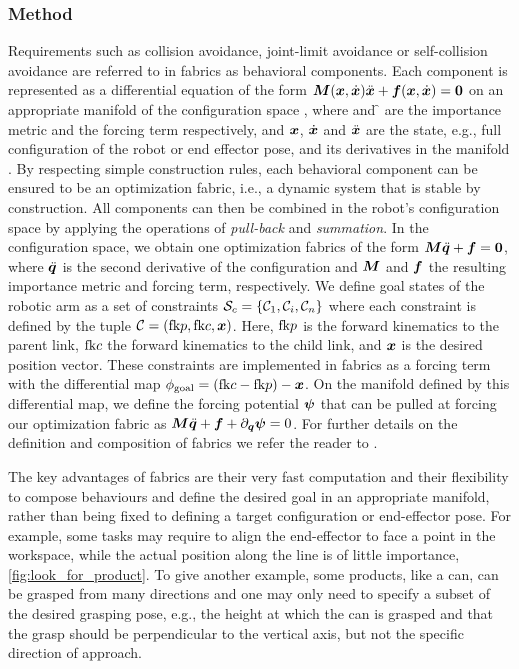 \subsubsection{Method}
Requirements such as collision avoidance, joint-limit avoidance or self-collision avoidance are referred to in fabrics as behavioral components. Each component is represented as a differential equation of the form
$\bm{M}(\bm{x},\dot{\bm{x}})\ddot{\bm{x}}+\bm{f}(\bm{x},\dot{\bm{x}})=\bm{0}$ on an appropriate
manifold \X{} of the configuration space \Q{}, where \M{} and \f{} are the importance metric and the forcing term respectively, and $\bm{x}$, $\dot{\bm{x}}$ and $\ddot{\bm{x}}$ are the state, e.g., full configuration of the robot or end effector pose, and its derivatives in the manifold \X{}.
By respecting
simple construction rules, each behavioral component can be ensured to
be an optimization fabric, i.e., a dynamic system that is
stable by construction. All components can then be combined
in the robot's configuration space by applying the
operations of \textit{pull-back} and \textit{summation}. In
the configuration space, we obtain one optimization fabrics
of the form $\bm{M}\ddot{\bm{q}} + \bm{f} = \bm{0}$, where $\ddot{\bm{q}}$ is the second derivative of the configuration and $\bm{M}$ and $\bm{f}$ the resulting importance metric and forcing term, respectively.
We define goal states of the robotic arm as a set of
constraints $\mathcal{S}_c = \{\mathcal{C}_1,\mathcal{C}_i,\mathcal{C}_n\}$ where each
constraint \Con{} is defined by the tuple
$\mathcal{C}=(\textrm{fk}{p},\textrm{fk}{c},\bm{x})$. Here, $\textrm{fk}{p}$ is the forward
kinematics to the parent link, $\textrm{fk}{c}$ the forward
kinematics to the child link, and $\bm{x}$ is the desired position
vector. These constraints are implemented in \ac{fabrics} as a forcing term with the
differential map $\phi_{\textrm{goal}} = (\textrm{fk}{c} - \textrm{fk}{p}) -
\bm{x}$. On the manifold defined by this differential map, we
define the forcing potential $\bm{\psi}$ that can be pulled at
forcing our optimization fabric as
$\bm{M}\ddot{\bm{q}}+\bm{f}+\partial_{\bm{q}}\bm{\psi} = 0$.
For further details on the definition and composition of fabrics we refer the reader to \cite{Spahn2023}.

The key advantages of \ac{fabrics} are their very fast computation and their flexibility to
compose behaviours and define the desired goal in an appropriate manifold, rather than being
fixed to defining a target configuration or end-effector pose. For
example, some tasks may require to align the end-effector
to face a point in the workspace, while
the actual position along the line is of little importance,
\cref{fig:look_for_product}.
To give another example, some products, like a can, can be grasped from many directions and one may only need to specify a subset of the desired grasping pose, e.g., the height at which the can is grasped and that the grasp should be perpendicular to the vertical axis, but not the specific direction of approach.


